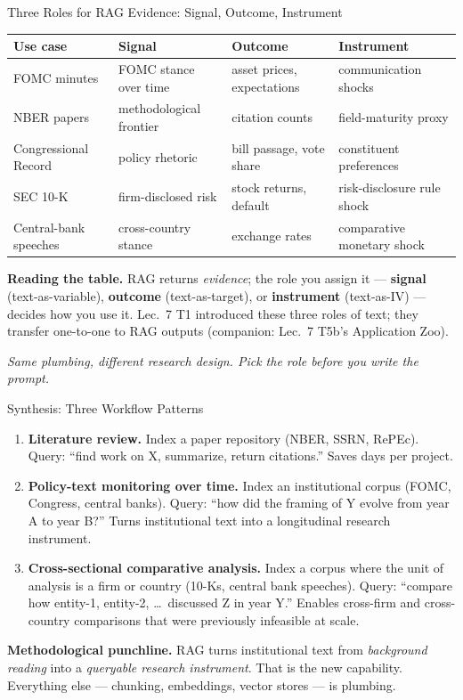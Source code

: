 \begin{frame}{Three Roles for RAG Evidence: Signal, Outcome, Instrument}
\small
\begin{center}
\renewcommand{\arraystretch}{1.0}
\begin{tabular}{|p{2.7cm}|p{2.9cm}|p{2.9cm}|p{2.9cm}|}
\hline
\textbf{Use case} & \textbf{Signal} & \textbf{Outcome} & \textbf{Instrument} \\
\hline
FOMC minutes & FOMC stance over time & asset prices, expectations & communication shocks \\
\hline
NBER papers & methodological frontier & citation counts & field-maturity proxy \\
\hline
Congressional Record & policy rhetoric & bill passage, vote share & constituent preferences \\
\hline
SEC 10-K & firm-disclosed risk & stock returns, default & risk-disclosure rule shock \\
\hline
Central-bank speeches & cross-country stance & exchange rates & comparative monetary shock \\
\hline
\end{tabular}
\end{center}

\smallskip
\textbf{Reading the table.} RAG returns \emph{evidence}; the role you assign it --- \textbf{signal} (text-as-variable), \textbf{outcome} (text-as-target), or \textbf{instrument} (text-as-IV) --- decides how you use it. Lec.\ 7 T1 introduced these three roles of text; they transfer one-to-one to RAG outputs (companion: Lec.\ 7 T5b's Application Zoo).

\smallskip
\textit{Same plumbing, different research design. Pick the role before you write the prompt.}
\end{frame}

\begin{frame}{Synthesis: Three Workflow Patterns}
\begin{enumerate}
\item \textbf{Literature review.} Index a paper repository (NBER, SSRN, RePEc). Query: ``find work on X, summarize, return citations.'' Saves days per project.

\medskip
\item \textbf{Policy-text monitoring over time.} Index an institutional corpus (FOMC, Congress, central banks). Query: ``how did the framing of Y evolve from year A to year B?'' Turns institutional text into a longitudinal research instrument.

\medskip
\item \textbf{Cross-sectional comparative analysis.} Index a corpus where the unit of analysis is a firm or country (10-Ks, central bank speeches). Query: ``compare how entity-1, entity-2, \dots\ discussed Z in year Y.'' Enables cross-firm and cross-country comparisons that were previously infeasible at scale.
\end{enumerate}

\bigskip
\textbf{Methodological punchline.} RAG turns institutional text from \emph{background reading} into a \emph{queryable research instrument}. That is the new capability. Everything else --- chunking, embeddings, vector stores --- is plumbing.
\end{frame}

